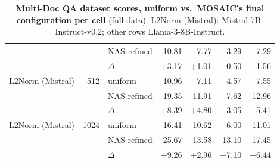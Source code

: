 \begin{table}[tp]
\begin{tabular}{@{}l r l r r r r @{}}
     &  & NAS-refined & 10.81 & 7.77 & 3.29 & 7.29 \\
     &  & $\Delta$ & +3.17 & +1.01 & +0.50 & +1.56 \\
    \midrule
    L2Norm (Mistral) & 512 & uniform & 10.96 & 7.11 & 4.57 & 7.55 \\
     &  & NAS-refined & 19.35 & 11.91 & 7.62 & 12.96 \\
     &  & $\Delta$ & +8.39 & +4.80 & +3.05 & +5.41 \\
    \midrule
    L2Norm (Mistral) & 1024 & uniform & 16.41 & 10.62 & 6.00 & 11.01 \\
     &  & NAS-refined & 25.67 & 13.58 & 13.10 & 17.45 \\
     &  & $\Delta$ & +9.26 & +2.96 & +7.10 & +6.44 \\
    \bottomrule
  \end{tabular}
  \caption{\textbf{Multi-Doc QA dataset scores, uniform vs.\ MOSAIC's final configuration per cell} (full data). L2Norm (Mistral): Mistral-7B-Instruct-v0.2; other rows Llama-3-8B-Instruct.}
  \label{tab:app-lb-MULTI_DOCUMENT_QA}
\end{table}

